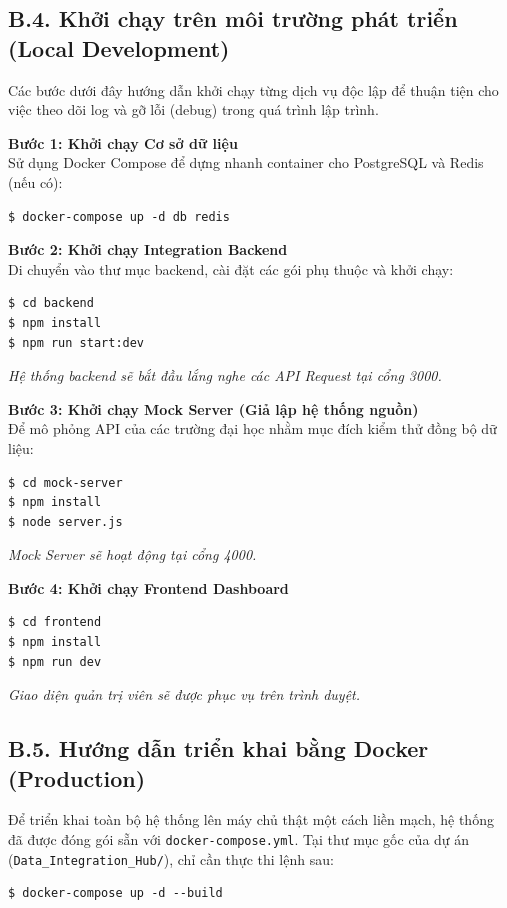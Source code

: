 \subsection*{B.4. Khởi chạy trên môi trường phát triển (Local Development)}
Các bước dưới đây hướng dẫn khởi chạy từng dịch vụ độc lập để thuận tiện cho việc theo dõi log và gỡ lỗi (debug) trong quá trình lập trình.

\textbf{Bước 1: Khởi chạy Cơ sở dữ liệu} \\
Sử dụng Docker Compose để dựng nhanh container cho PostgreSQL và Redis (nếu có):
\begin{verbatim}
$ docker-compose up -d db redis
\end{verbatim}

\textbf{Bước 2: Khởi chạy Integration Backend} \\
Di chuyển vào thư mục backend, cài đặt các gói phụ thuộc và khởi chạy:
\begin{verbatim}
$ cd backend
$ npm install
$ npm run start:dev
\end{verbatim}
\textit{Hệ thống backend sẽ bắt đầu lắng nghe các API Request tại cổng 3000.}

\textbf{Bước 3: Khởi chạy Mock Server (Giả lập hệ thống nguồn)} \\
Để mô phỏng API của các trường đại học nhằm mục đích kiểm thử đồng bộ dữ liệu:
\begin{verbatim}
$ cd mock-server
$ npm install
$ node server.js
\end{verbatim}
\textit{Mock Server sẽ hoạt động tại cổng 4000.}

\textbf{Bước 4: Khởi chạy Frontend Dashboard} \\
\begin{verbatim}
$ cd frontend
$ npm install
$ npm run dev
\end{verbatim}
\textit{Giao diện quản trị viên sẽ được phục vụ trên trình duyệt.}

\subsection*{B.5. Hướng dẫn triển khai bằng Docker (Production)}
Để triển khai toàn bộ hệ thống lên máy chủ thật một cách liền mạch, hệ thống đã được đóng gói sẵn với \texttt{docker-compose.yml}. Tại thư mục gốc của dự án (\texttt{Data\_Integration\_Hub/}), chỉ cần thực thi lệnh sau:

\begin{verbatim}
$ docker-compose up -d --build
\end{verbatim}

